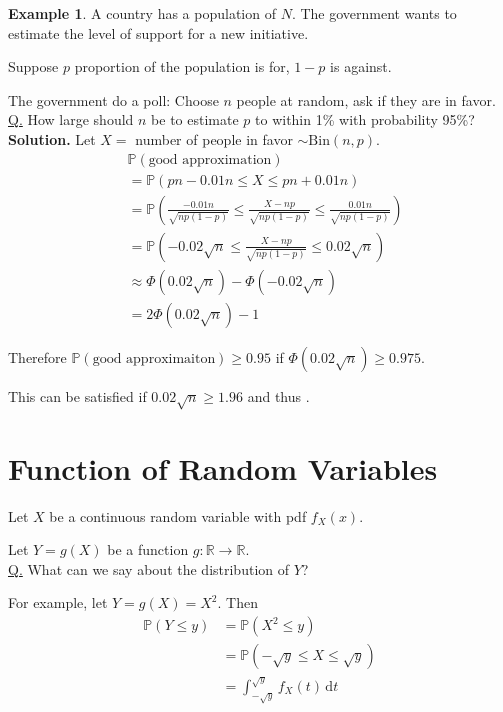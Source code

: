 \documentclass[a4paper,11pt]{amsbook}
\theoremstyle{definition}
\newtheorem{example}{\hspace{-2em} \color{darkblue} Example}[chapter]
\theoremstyle{remark}
\newcommand{\R}{\mathbb{R}}
\renewcommand{\P}{\mathbb{P}}
\newcommand\0{\varnothing}
\newcommand\dt[1][t]{\,\mathrm{d}#1}
\newcommand\Bin{\text{Bin}}
\begin{document}
    \begin{example}
        A country has a population of $N$.
        The government wants to estimate the level of support for a new initiative.

        Suppose $p$ proportion of the population is for, $1-p$ is against.
        
        The government do a poll: Choose $n$ people at random, ask if they are in favor.\\
        \underline{Q.} How large should $n$ be to estimate $p$ to within 1\% with probability 95\%?\\
        \textbf{Solution.} Let $X=$ number of people in favor $\sim\Bin(n,p)$. %
        \begin{align*}
            &\P(\text{good approximation}) \\
            &=\P(pn-0.01n\leq X\leq pn+0.01n) \\
            &=\P\left(\frac{-0.01n}{\sqrt{np(1-p)}}\leq\frac{X-np}{\sqrt{np(1-p)}}\leq\frac{0.01n}{\sqrt{np(1-p)}}\right) \\
            &=\P\left(-0.02\sqrt n\leq\frac{X-np}{\sqrt{np(1-p)}}\leq0.02\sqrt n\right) \tag{since $p(1-p)\leq\frac14$} \\ 
            &\approx\Phi(0.02\sqrt n)-\Phi(-0.02\sqrt n) \\ 
            &=2\Phi(0.02\sqrt n)-1
        \end{align*}

        Therefore $\P(\text{good approximaiton})\geq 0.95$ if $\Phi(0.02\sqrt n)\geq0.975$.

        This can be satisfied if $0.02\sqrt n\geq1.96$ and thus .
    \end{example}

\chapter{Function of Random Variables}
    Let $X$ be a continuous random variable with pdf $f_X(x)$.

    Let $Y=g(X)$ be a function $g:\R\to\R$.\\
    \underline{Q.} What can we say about the distribution of $Y$?

    For example, let $Y=g(X)=X^2$. Then
    \begin{align*}
        \P(Y\leq y)&=\P(X^2\leq y) \\
        &=\P(-\sqrt y\leq X\leq\sqrt y) \\
        &=\int_{-\sqrt y}^{\sqrt y}f_X(t)\dt
    \end{align*}
\end{document}
